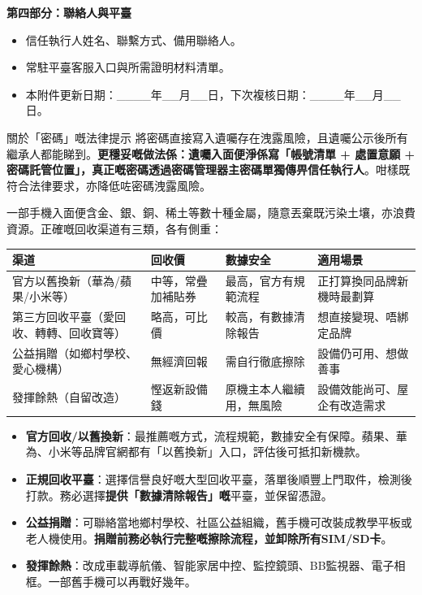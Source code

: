 \textbf{第四部分：聯絡人與平臺}

\begin{itemize}
  \item 信任執行人姓名、聯繫方式、備用聯絡人。
  \item 常駐平臺客服入口與所需證明材料清單。
  \item 本附件更新日期：\_\_\_\_年\_\_月\_\_日，下次複核日期：\_\_\_\_年\_\_月\_\_日。
\end{itemize}

\begin{tcbwarn}{關於「密碼」嘅法律提示}
將密碼直接寫入遺囑存在洩露風險，且遺囑公示後所有繼承人都能睇到。\textbf{更穩妥嘅做法係：遺囑入面便淨係寫「帳號清單 + 處置意願 + 密碼託管位置」，真正嘅密碼透過密碼管理器主密碼單獨傳畀信任執行人}。咁樣既符合法律要求，亦降低咗密碼洩露風險。

\end{tcbwarn}


一部手機入面便含金、銀、銅、稀土等數十種金屬，隨意丟棄既污染土壤，亦浪費資源。正確嘅回收渠道有三類，各有側重：

\begin{center}
\begin{tabularx}{\linewidth}{|X|X|X|X|}
\hline
\textbf{渠道} & \textbf{回收價} & \textbf{數據安全} & \textbf{適用場景} \tabularnewline
\hline
官方以舊換新（華為/蘋果/小米等） & 中等，常疊加補貼券 & 最高，官方有規範流程 & 正打算換同品牌新機時最劃算 \tabularnewline
第三方回收平臺（愛回收、轉轉、回收寶等） & 略高，可比價 & 較高，有數據清除報告 & 想直接變現、唔綁定品牌 \tabularnewline
公益捐贈（如鄉村學校、愛心機構） & 無經濟回報 & 需自行徹底擦除 & 設備仍可用、想做善事 \tabularnewline
發揮餘熱（自留改造） & 慳返新設備錢 & 原機主本人繼續用，無風險 & 設備效能尚可、屋企有改造需求 \tabularnewline
\hline
\end{tabularx}
\end{center}

\begin{itemize}
  \item \textbf{官方回收/以舊換新}：最推薦嘅方式，流程規範，數據安全有保障。蘋果、華為、小米等品牌官網都有「以舊換新」入口，評估後可抵扣新機款。
  \item \textbf{正規回收平臺}：選擇信譽良好嘅大型回收平臺，落單後順豐上門取件，檢測後打款。務必選擇\textbf{提供「數據清除報告」嘅}平臺，並保留憑證。
  \item \textbf{公益捐贈}：可聯絡當地鄉村學校、社區公益組織，舊手機可改裝成教學平板或老人機使用。\textbf{捐贈前務必執行完整嘅擦除流程，並卸除所有SIM/SD卡}。
  \item \textbf{發揮餘熱}：改成車載導航儀、智能家居中控、監控鏡頭、BB監視器、電子相框。一部舊手機可以再戰好幾年。
\end{itemize}

